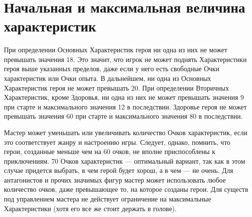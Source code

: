 \section{Начальная и максимальная величина характеристик}
\paragraph{}
{\color{orange}При определении Основных Характеристик героя ни одна из них не может превышать значения 18. Это значит, что игрок не может поднять Характеристики героя выше указанных пределов, даже если у него есть свободные Очки характеристик или Очки опыта. В дальнейшем, ни одна из Основных Характеристик героя не может превышать 20. 
\newline
При определении Вторичных Характеристик, кроме Здоровья, ни одна из них не может превышать значения 9 при старте и максимального значения 12 в последствии.
\newline
Здоровье героя не может превышать значения 60 при старте и максимального значения 80 в последствии.}

Мастер может уменьшать или увеличивать количество Очков характеристик, если это соответствует жанру и настроению игры. Следует, однако, помнить, что герои, созданные меньше чем на 60 очков, не вполне приспособлены к приключениям. 70 Очков характеристик — оптимальный вариант, так как в этом случае придется выбрать, в чем герой будет хорош, а в чем — не очень.
\newline
Для антагонистов и прочих значимых фигур мастер может использовать любое количество очков, даже превышающее то, на которое созданы герои. Для существ под управлением мастера не действует ограничение на максимальные Характеристики (хотя его все же стоит держать в голове).

